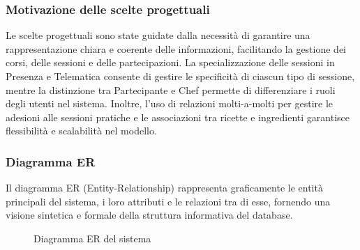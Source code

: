 \subsubsection{Motivazione delle scelte progettuali}
Le scelte progettuali sono state guidate dalla necessità di garantire una rappresentazione chiara e coerente delle informazioni, facilitando la gestione dei corsi, delle sessioni e delle partecipazioni. La specializzazione delle sessioni in Presenza e Telematica consente di gestire le specificità di ciascun tipo di sessione, mentre la distinzione tra Partecipante e Chef permette di differenziare i ruoli degli utenti nel sistema. Inoltre, l'uso di relazioni molti-a-molti per gestire le adesioni alle sessioni pratiche e le associazioni tra ricette e ingredienti garantisce flessibilità e scalabilità nel modello.
\subsubsection{Diagramma ER}
Il diagramma ER (Entity-Relationship) rappresenta graficamente le entità principali del sistema, i loro attributi e le relazioni tra di esse, fornendo una visione sintetica e formale della struttura informativa del database.

\begin{figure}[H]
    \noindent{}
    \caption{Diagramma ER del sistema}
\end{figure}
